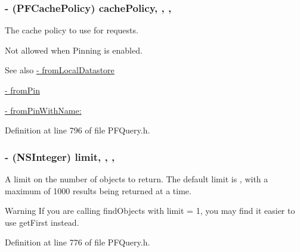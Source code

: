 \subsubsection[{cache\+Policy}]{\setlength{\rightskip}{0pt plus 5cm}-\/ (P\+F\+Cache\+Policy) cache\+Policy\hspace{0.3cm}{\ttfamily [read]}, {\ttfamily [write]}, {\ttfamily [atomic]}, {\ttfamily [assign]}}\label{interface_p_f_query_ad63ead0a9e38610875a9222bc9015b9d}
The cache policy to use for requests.

Not allowed when Pinning is enabled.

\begin{DoxySeeAlso}{See also}
\hyperlink{interface_p_f_query_a04816c50721c554db2349cfbe637472f}{-\/ from\+Local\+Datastore} 

\hyperlink{interface_p_f_query_aec25334cc9bf9c212e0e0d6587603787}{-\/ from\+Pin} 

\hyperlink{interface_p_f_query_a4d5fe5dd1a6b90e8bde8b4c8e4eefaf0}{-\/ from\+Pin\+With\+Name\+:} 
\end{DoxySeeAlso}


Definition at line 796 of file P\+F\+Query.\+h.

\hypertarget{interface_p_f_query_a78060204fccd16a9ac9718b219778b64}{}
\subsubsection[{limit}]{\setlength{\rightskip}{0pt plus 5cm}-\/ (N\+S\+Integer) limit\hspace{0.3cm}{\ttfamily [read]}, {\ttfamily [write]}, {\ttfamily [nonatomic]}, {\ttfamily [assign]}}\label{interface_p_f_query_a78060204fccd16a9ac9718b219778b64}
A limit on the number of objects to return. The default limit is {}, with a maximum of 1000 results being returned at a time.

\begin{DoxyWarning}{Warning}
If you are calling {\ttfamily find\+Objects} with {\ttfamily limit = 1}, you may find it easier to use {\ttfamily get\+First} instead. 
\end{DoxyWarning}


Definition at line 776 of file P\+F\+Query.\+h.

\hypertarget{interface_p_f_query_a89e6f1c2e8ce45422b7a08fac4c36f24}{}

